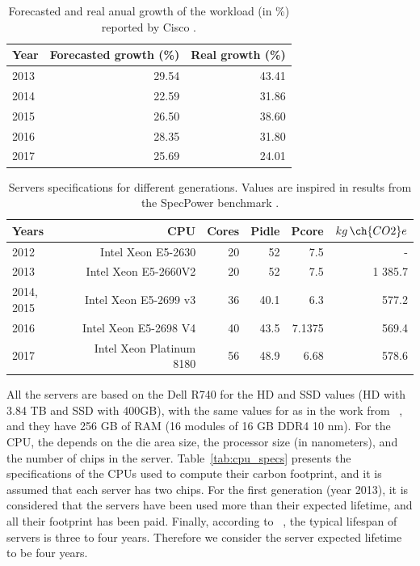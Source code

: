 \begin{table}[h]
  \caption{Forecasted and real anual growth of the workload (in \%) reported by Cisco \cite{cisco_global_cloud_index_2012,cisco_global_cloud_index_2013,cisco_global_cloud_index_2014,cisco_global_cloud_index_2015,cisco_global_cloud_index_2018}.} \centering
  \label{tab:workload_forecast_and_real_growth} 
  \begin{tabular}{|l|r|r|}
  \hline    
    \textbf{Year} & \textbf{Forecasted growth (\%)} &   \textbf{Real growth (\%)}  \\
  \hline
   2013     & 29.54 & 43.41 \\
  \hline
   2014    & 22.59 & 31.86 \\
  \hline
   2015 &    26.50 & 38.60 \\
  \hline
  2016   & 28.35 & 31.80 \\
  \hline
  2017   & 25.69 & 24.01 \\
  \hline  
\end{tabular}  
\end{table}




\begin{table}[h]
  \small
  \caption{Servers specifications for different generations. Values are inspired in results from the SpecPower benchmark \cite{spec_2014,spec_2017,spec_2016,spec_2013}.} \centering
  \label{tab:servers_specs} 
  \begin{tabular}{|l|r|r|r|r|r|}
  \hline    
  \textbf{Years} & \textbf{CPU} &   \textbf{Cores} & \textbf{Pidle}  & \textbf{Pcore}  & \textbf{$kg\,\ch{CO2}e$}  \\
  \hline
   2012     & Intel Xeon E5-2630 & 20 & 52 & 7.5  & -            \\
  \hline
   2013    & Intel Xeon E5-2660V2 & 20 & 52 & 7.5  & 1 385.7     \\
  \hline
   2014, 2015 & Intel Xeon E5-2699 v3 & 36 & 40.1 & 6.3  & 577.2  \\
  \hline
  2016   & Intel Xeon E5-2698 V4 &  40 & 43.5 & 7.1375  & 569.4  \\
  \hline
  2017  & Intel Xeon Platinum 8180 & 56 & 48.9 & 6.68  & 578.6   \\
  \hline  
\end{tabular}  
\end{table}




All the servers are based on the Dell R740 for the HD and SSD values (HD with 3.84 TB and SSD with 400GB), with the same values for  as in the work from ~\citep{gupta2022_ACT}, and they have 256 GB of RAM (16 modules of 16 GB DDR4 10 nm). For the CPU, the  depends on the die area size, the processor size (in nanometers), and the number of chips in the server. Table~\ref{tab:cpu_specs} presents the specifications of the CPUs used to compute their carbon footprint, and it is assumed that each server has two chips. For the first generation (year 2013), it is considered that the servers have been used more than their expected lifetime, and all their  footprint has been paid. Finally, according to ~\citet{datacenter_as_computer}, the typical lifespan of servers is three to four years. Therefore we consider the server expected lifetime to be four years.


